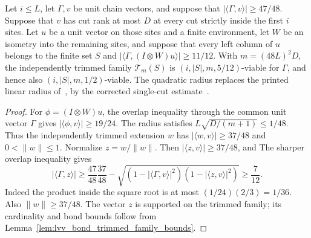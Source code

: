 \begin{lemma}
    \label{lem:lvv_bond_trimmed_family_viable}
    \leanok
    Let $i\le L$, let $\Gamma,v$ be unit chain vectors, and suppose that
    $|\langle\Gamma,v\rangle|\ge47/48$. Suppose that $v$ has cut rank at
    most $D$ at every cut strictly inside the first $i$ sites. Let $u$ be
    a unit vector on those sites and a finite environment, let $W$ be an
    isometry into the remaining sites, and suppose that every left column
    of $u$ belongs to the finite set $S$ and
    $|\langle\Gamma,(I\otimes W)u\rangle|\ge11/12$.
    With $m=(48L)^2D$, the independently trimmed family $\mathcal T_m(S)$
    is $(i,|S|,m,5/12)$-viable for $\Gamma$, and hence also
    $(i,|S|,m,1/2)$-viable.
    The quadratic radius replaces the printed linear radius
    of~\cite[Claim~2.10, source lines 549--559]{Landau2015Polynomial}, by
    the corrected single-cut estimate~\cite{gap:lvv13_trimming_radius}.
\end{lemma}
\begin{proof}
    \leanok
    For $\phi=(I\otimes W)u$, the overlap inequality through the common
    unit vector $\Gamma$ gives $|\langle\phi,v\rangle|\ge19/24$.
    The radius satisfies
    $L\sqrt{D/(m+1)}\le1/48$. Thus the independently trimmed extension
    $w$ has $|\langle w,v\rangle|\ge37/48$ and $0<\|w\|\le1$.
    Normalize $z=w/\|w\|$. Then $|\langle z,v\rangle|\ge37/48$, and
    The sharper overlap inequality gives
    \[
        |\langle\Gamma,z\rangle|
        \ge\frac{47}{48}\frac{37}{48}
        -\sqrt{(1-|\langle\Gamma,v\rangle|^2)
            (1-|\langle z,v\rangle|^2)}
        \ge\frac{7}{12}.
    \]
    Indeed the product inside the square root is at most
    $(1/24)(2/3)=1/36$. Also $\|w\|\ge37/48$.
    The vector $z$ is supported on the trimmed family; its cardinality
    and bond bounds follow from
    Lemma~\ref{lem:lvv_bond_trimmed_family_bounds}.
\end{proof}

